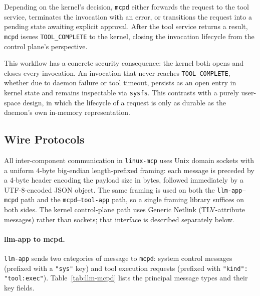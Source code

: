 Depending on the kernel's decision, \texttt{mcpd} either forwards the request to the tool service, terminates the invocation with an error, or transitions the request into a pending state awaiting explicit approval.
After the tool service returns a result, \texttt{mcpd} issues \texttt{TOOL\_COMPLETE} to the kernel, closing the invocation lifecycle from the control plane's perspective.

This workflow has a concrete security consequence: the kernel both opens and closes every invocation.
An invocation that never reaches \texttt{TOOL\_COMPLETE}, whether due to daemon failure or tool timeout, persists as an open entry in kernel state and remains inspectable via \texttt{sysfs}.
This contrasts with a purely user-space design, in which the lifecycle of a request is only as durable as the daemon's own in-memory representation.



\subsection{Wire Protocols}
\label{sec:wire-protocols}

All inter-component communication in \texttt{linux-mcp} uses Unix domain sockets with a uniform 4-byte big-endian length-prefixed framing: each message is preceded by a 4-byte header encoding the payload size in bytes, followed immediately by a UTF-8-encoded JSON object.
The same framing is used on both the \texttt{llm-app}--\texttt{mcpd} path and the \texttt{mcpd}--\texttt{tool-app} path, so a single framing library suffices on both sides.
The kernel control-plane path uses Generic Netlink (TLV-attribute messages) rather than sockets; that interface is described separately below.

\paragraph{llm-app to mcpd.}
\texttt{llm-app} sends two categories of message to \texttt{mcpd}: system control messages (prefixed with a \texttt{"sys"} key) and tool execution requests (prefixed with \texttt{"kind": "tool:exec"}).
Table~\ref{tab:llm-mcpd} lists the principal message types and their key fields.

